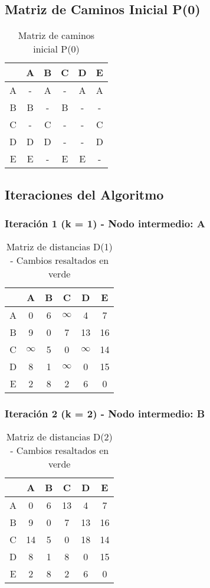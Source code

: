 \documentclass[12pt]{article}
\begin{document}
\subsection{Matriz de Caminos Inicial P(0)}
\begin{table}[h!]
\centering
\begin{tabular}{|c|c|c|c|c|c|}
\hline
 & A & B & C & D & E \\\hline
A & - & A & - & A & A \\\hline
B & B & - & B & - & - \\\hline
C & - & C & - & - & C \\\hline
D & D & D & - & - & D \\\hline
E & E & - & E & E & - \\\hline
\end{tabular}
\caption{Matriz de caminos inicial P(0)}
\end{table}

\subsection{Iteraciones del Algoritmo}
\subsubsection{Iteración 1 (k = 1) - Nodo intermedio: A}
\begin{table}[h!]
\centering
\begin{tabular}{|c|c|c|c|c|c|}
\hline
 & A & B & C & D & E \\\hline
A & 0 & 6 & $\infty$ & 4 & 7 \\\hline
B & 9 & 0 & 7 & \cellcolor{lightgreen} 13 & \cellcolor{lightgreen} 16 \\\hline
C & $\infty$ & 5 & 0 & $\infty$ & 14 \\\hline
D & 8 & 1 & $\infty$ & 0 & 15 \\\hline
E & 2 & \cellcolor{lightgreen} 8 & 2 & \cellcolor{lightgreen} 6 & 0 \\\hline
\end{tabular}
\caption{Matriz de distancias D(1) - Cambios resaltados en verde}
\end{table}

\subsubsection{Iteración 2 (k = 2) - Nodo intermedio: B}
\begin{table}[h!]
\centering
\begin{tabular}{|c|c|c|c|c|c|}
\hline
 & A & B & C & D & E \\\hline
A & 0 & 6 & \cellcolor{lightgreen} 13 & 4 & 7 \\\hline
B & 9 & 0 & 7 & 13 & 16 \\\hline
C & \cellcolor{lightgreen} 14 & 5 & 0 & \cellcolor{lightgreen} 18 & 14 \\\hline
D & 8 & 1 & \cellcolor{lightgreen} 8 & 0 & 15 \\\hline
E & 2 & 8 & 2 & 6 & 0 \\\hline
\end{tabular}
\caption{Matriz de distancias D(2) - Cambios resaltados en verde}
\end{table}
\end{document}
